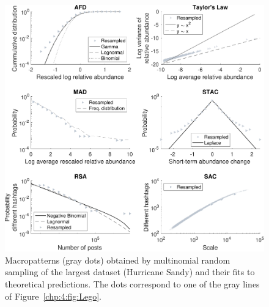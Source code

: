 \begin{figure}[t]
    \centering
    \includegraphics[width=\textwidth]{figures/chp4/Figure_Lego_gray.pdf}
    \caption[Macropatterns by multinomial random sampling]{Macropatterns (gray dots) obtained by multinomial random sampling of the largest dataset (Hurricane Sandy) and their fits to theoretical predictions. The dots correspond to one of the gray lines of Figure~\ref{chp:4:fig:Lego}.}
    \label{fig:appen:LegoAux}
\end{figure}

